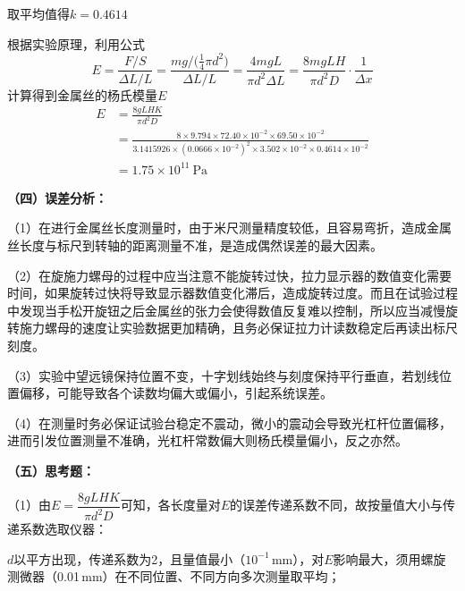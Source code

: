 \documentclass[12pt,a4paper,fontset=windows]{ctexart}
\begin{document}
\vspace{0.3cm}
取平均值得$k=0.4614$

根据实验原理，利用公式
\begin{equation*}
    E=\frac{F/S}{\Delta L/L}
     =\frac{mg\big/\big(\tfrac{1}{4}\pi d^{2}\big)}{\Delta L/L}
     =\frac{4mgL}{\pi d^{2}\Delta L}
     =\frac{8mgLH}{\pi d^{2}D}\cdot\frac{1}{\Delta x}
\end{equation*}
计算得到金属丝的杨氏模量$E$
\begin{align*}
    E&=\frac{8gLHK}{\pi d^{2}D}\\
     &=\frac{8\times9.794\times72.40\times10^{-2}\times69.50\times10^{-2}}
            {3.1415926\times(0.0666\times10^{-2})^{2}\times3.502\times10^{-2}\times0.4614\times10^{-2}}\\
     &=1.75\times10^{11}\ \mathrm{Pa}
\end{align*}

\vspace{0.6cm}

\noindent\textbf{（四）误差分析：}

\vspace{0.2cm}
（1）在进行金属丝长度测量时，由于米尺测量精度较低，且容易弯折，造成金属丝长度与标尺到转轴的距离测量不准，是造成偶然误差的最大因素。

（2）在旋施力螺母的过程中应当注意不能旋转过快，拉力显示器的数值变化需要时间，如果旋转过快将导致显示器数值变化滞后，造成旋转过度。而且在试验过程中发现当手松开旋钮之后金属丝的张力会使得数值反复难以控制，所以应当减慢旋转施力螺母的速度让实验数据更加精确，且务必保证拉力计读数稳定后再读出标尺刻度。

（3）实验中望远镜保持位置不变，十字划线始终与刻度保持平行垂直，若划线位置偏移，可能导致各个读数均偏大或偏小，引起系统误差。

（4）在测量时务必保证试验台稳定不震动，微小的震动会导致光杠杆位置偏移，进而引发位置测量不准确，光杠杆常数偏大则杨氏模量偏小，反之亦然。

\vspace{0.6cm}

\noindent\textbf{（五）思考题：}

\vspace{0.2cm}
（1）由$E=\dfrac{8gLHK}{\pi d^{2}D}$可知，各长度量对$E$的误差传递系数不同，故按量值大小与传递系数选取仪器：

$d$以平方出现，传递系数为2，且量值最小（$10^{-1}$\,mm），对$E$影响最大，须用螺旋测微器（0.01\,mm）在不同位置、不同方向多次测量取平均；
\end{document}
